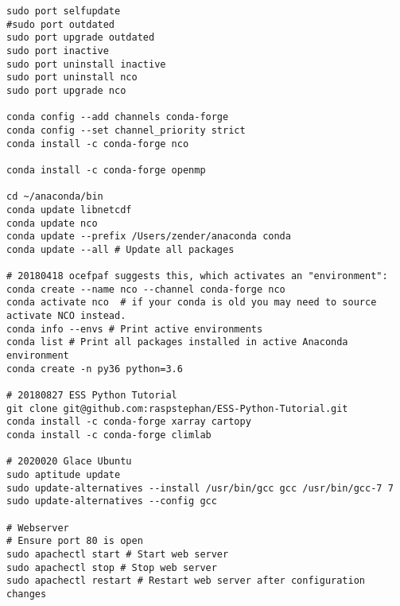 \documentclass[12pt,twoside]{article}
\begin{document}
\begin{verbatim}
sudo port selfupdate
#sudo port outdated
sudo port upgrade outdated
sudo port inactive
sudo port uninstall inactive
sudo port uninstall nco
sudo port upgrade nco

conda config --add channels conda-forge
conda config --set channel_priority strict
conda install -c conda-forge nco

conda install -c conda-forge openmp

cd ~/anaconda/bin
conda update libnetcdf
conda update nco
conda update --prefix /Users/zender/anaconda conda
conda update --all # Update all packages

# 20180418 ocefpaf suggests this, which activates an "environment":
conda create --name nco --channel conda-forge nco
conda activate nco  # if your conda is old you may need to source activate NCO instead.
conda info --envs # Print active environments
conda list # Print all packages installed in active Anaconda environment
conda create -n py36 python=3.6

# 20180827 ESS Python Tutorial
git clone git@github.com:raspstephan/ESS-Python-Tutorial.git
conda install -c conda-forge xarray cartopy
conda install -c conda-forge climlab

# 2020020 Glace Ubuntu
sudo aptitude update
sudo update-alternatives --install /usr/bin/gcc gcc /usr/bin/gcc-7 7
sudo update-alternatives --config gcc

# Webserver
# Ensure port 80 is open
sudo apachectl start # Start web server
sudo apachectl stop # Stop web server
sudo apachectl restart # Restart web server after configuration changes
\end{verbatim}
\end{document}
